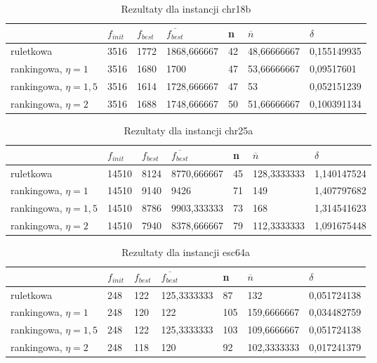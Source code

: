 \begin{table}[H]
\label{T5_chr18b}
\begin{tabular}{l l l l l l l}
\hline
 & $f_{init}$ & $f_{best}$ & $\overline{f_{best}}$ & n & $\overline{n}$ & $\delta$ \\
\hline
ruletkowa & 3516 & 1772 & 1868,666667 & 42 & 48,66666667 & 0,155149935\\
rankingowa, $\eta = 1$ & 3516 & 1680 & 1700 & 47 & 53,66666667 & 0,09517601\\
rankingowa, $\eta = 1,5$ & 3516 & 1614 & 1728,666667 & 47 & 53 & 0,052151239\\
rankingowa, $\eta = 2$ & 3516 & 1688 & 1748,666667 & 50 & 51,66666667 & 0,100391134\\
\hline
\end{tabular}
\caption{Rezultaty dla instancji chr18b}
\end{table}

\begin{table}[H]
\label{T5_chr25a}
\begin{tabular}{l l l l l l l}
\hline
 & $f_{init}$ & $f_{best}$ & $\overline{f_{best}}$ & n & $\overline{n}$ & $\delta$ \\
\hline
ruletkowa & 14510 & 8124 & 8770,666667 & 45 & 128,3333333 & 1,140147524\\
rankingowa, $\eta = 1$ & 14510 & 9140 & 9426 & 71 & 149 & 1,407797682\\
rankingowa, $\eta = 1,5$ & 14510 & 8786 & 9903,333333 & 73 & 168 & 1,314541623\\
rankingowa, $\eta = 2$ & 14510 & 7940 & 8378,666667 & 79 & 112,3333333 & 1,091675448\\
\hline
\end{tabular}
\caption{Rezultaty dla instancji chr25a}
\end{table}

\begin{table}[H]
\label{T5_esc64a}
\begin{tabular}{l l l l l l l}
\hline
 & $f_{init}$ & $f_{best}$ & $\overline{f_{best}}$ & n & $\overline{n}$ & $\delta$ \\
\hline
ruletkowa & 248 & 122 & 125,3333333 & 87 & 132 & 0,051724138\\
rankingowa, $\eta = 1$ & 248 & 120 & 122 & 105 & 159,6666667 & 0,034482759\\
rankingowa, $\eta = 1,5$ & 248 & 122 & 125,3333333 & 103 & 109,6666667 & 0,051724138\\
rankingowa, $\eta = 2$ & 248 & 118 & 120 & 92 & 102,3333333 & 0,017241379\\
\hline
\end{tabular}
\caption{Rezultaty dla instancji esc64a}
\end{table}

